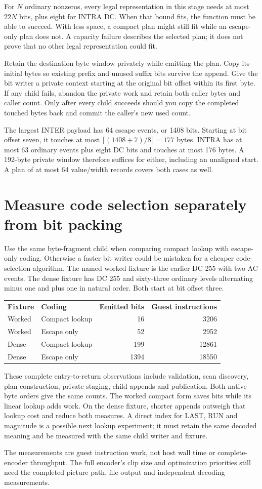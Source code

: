 For $N$ ordinary nonzeros, every legal representation in this stage needs at most
$22N$ bits, plus eight for INTRA DC. When that bound fits, the function must be
able to succeed. With less space, a compact plan might still fit while an
escape-only plan does not. A capacity failure describes the selected plan;
it does not prove that no other legal representation could fit.

Retain the destination byte window privately while emitting the plan. Copy its
initial bytes so existing prefix and unused suffix bits survive the append.
Give the bit writer a private context starting at the original bit offset within
its first byte. If any child fails, abandon the private work and retain both
caller bytes and caller count. Only after every child succeeds should you copy
the completed touched bytes back and commit the caller's new used count.

The largest INTER payload has 64 escape events, or 1408 bits. Starting at bit
offset seven, it touches at most $\lceil(1408+7)/8\rceil=177$ bytes. INTRA has at
most 63 ordinary events plus eight DC bits and touches at most 176 bytes. A
192-byte private window therefore suffices for either, including an unaligned
start. A plan of at most 64 value/width records covers both cases as well.

\section{Measure code selection separately from bit packing}
Use the same byte-fragment child when comparing compact lookup with escape-only
coding. Otherwise a faster bit writer could be mistaken for a cheaper code-selection
algorithm. The named worked fixture is the earlier DC 255 with two AC events.
The dense fixture has DC 255 and sixty-three ordinary levels alternating minus
one and plus one in natural order. Both start at bit offset three.

\begin{center}
\begin{tabular}{llrr}
\textbf{Fixture} & \textbf{Coding} & \textbf{Emitted bits} & \textbf{Guest instructions}\\
Worked & Compact lookup & 16 & 3206\\
Worked & Escape only & 52 & 2952\\
Dense & Compact lookup & 199 & 12861\\
Dense & Escape only & 1394 & 18550
\end{tabular}
\end{center}
These complete entry-to-return observations include validation, scan discovery,
plan construction, private staging, child appends and publication. Both native
byte orders give the same counts. The worked compact form saves bits while its
linear lookup adds work. On the dense fixture, shorter appends outweigh that
lookup cost and reduce both measures. A direct index for LAST, RUN and magnitude
is a possible next lookup experiment; it must retain the same decoded meaning
and be measured with the same child writer and fixture.

The measurements are guest instruction work, not host wall time or complete-encoder
throughput. The full encoder's clip size and optimization priorities still need
the completed picture path, file output and independent decoding measurements.
